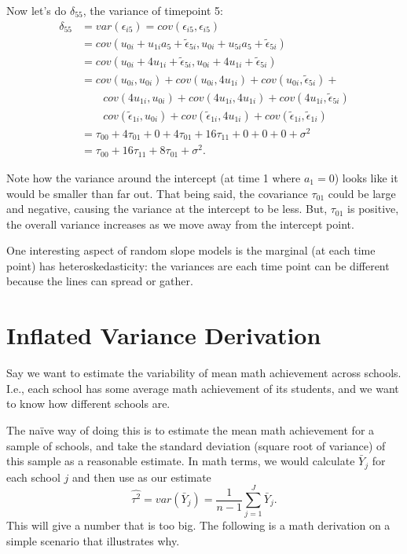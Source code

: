 \documentclass[
  letterpaper,
  DIV=11,
  numbers=noendperiod]{scrreprt}
\begin{document}
Now let's do \(\delta_{55}\), the variance of timepoint 5:
\[\begin{aligned}
\delta_{55} &= var( \epsilon_{i5} ) = cov( \epsilon_{i5}, \epsilon_{i5} ) \\
   &= cov(  u_{0i} + u_{1i} a_5 + \tilde{\epsilon}_{5i},  u_{0i} + u_{5i} a_5 + \tilde{\epsilon}_{5i} ) \\
   &= cov(  u_{0i} + 4 u_{1i} + \tilde{\epsilon}_{5i},  u_{0i} + 4 u_{1i} + \tilde{\epsilon}_{5i} ) \\
   &= cov(  u_{0i}, u_{0i} ) + cov(  u_{0i}, 4 u_{1i} )  + cov( u_{0i},  \tilde{\epsilon}_{5i} ) + \\
    &\qquad cov( 4 u_{1i}, u_{0i} ) + cov( 4 u_{1i}, 4 u_{1i} )  + cov( 4 u_{1i}, \tilde{\epsilon}_{5i} ) \\
    & \qquad cov( \tilde{\epsilon}_{1i}, u_{0i}) + cov( \tilde{\epsilon}_{1i}, 4 u_{1i} )  + cov( \tilde{\epsilon}_{1i},\tilde{\epsilon}_{1i} )  \\
   &= \tau_{00} + 4 \tau_{01} + 0 + 4 \tau_{01} + 16 \tau_{11} + 0 + 0 + 0 + \sigma^2 \\
   &= \tau_{00} + 16 \tau_{11} + 8 \tau_{01} + \sigma^2 .
\end{aligned}\]

Note how the variance around the intercept (at time 1 where \(a_1 = 0\))
looks like it would be smaller than far out. That being said, the
covariance \(\tau_{01}\) could be large and negative, causing the
variance at the intercept to be less. But, \(\tau_{01}\) is positive,
the overall variance increases as we move away from the intercept point.

One interesting aspect of random slope models is the marginal (at each
time point) has heteroskedasticity: the variances are each time point
can be different because the lines can spread or gather.

\hypertarget{inflated-variance-derivation}{%
\chapter{Inflated Variance
Derivation}\label{inflated-variance-derivation}}

Say we want to estimate the variability of mean math achievement across
schools. I.e., each school has some average math achievement of its
students, and we want to know how different schools are.

The naïve way of doing this is to estimate the mean math achievement for
a sample of schools, and take the standard deviation (square root of
variance) of this sample as a reasonable estimate. In math terms, we
would calculate \(\bar{Y}_j\) for each school \(j\) and then use as our
estimate
\[\widehat{\tau^2} = var( \bar{Y}_j ) = \frac{1}{n-1} \sum_{j=1}^J \bar{Y}_j .\]
This will give a number that is too big. The following is a math
derivation on a simple scenario that illustrates why.
\end{document}
